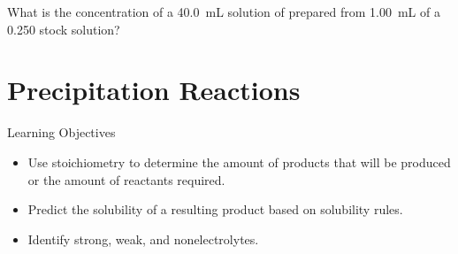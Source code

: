 \documentclass[notes=only]{beamer}
\begin{document}
\begin{onyourown}
	What is the concentration of a \SI{40.0}{\milli\liter} solution of
	 prepared from \SI{1.00}{\milli\liter} of a \SI{0.250}{\Molar}
	stock solution?
\end{onyourown}

\section{Precipitation Reactions}

\begin{frame}{Learning Objectives}
	\begin{itemize}
	\item Use stoichiometry to determine the amount of products that will be
		produced or the amount of reactants required.
	\item Predict the solubility of a resulting product based on solubility
		rules.
	\item Identify strong, weak, and nonelectrolytes.
\end{itemize}
\end{frame}
\end{document}
